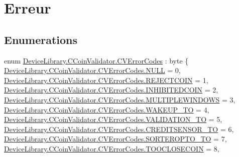 \hypertarget{group___erreur}{}\section{Erreur}
\label{group___erreur}
\subsection*{Enumerations}
\begin{DoxyCompactItemize}
\item 
enum \mbox{\hyperlink{group___erreur_ga68c5b73cc3b337502d9f92154d933591}{Device\+Library.\+C\+Coin\+Validator.\+C\+V\+Error\+Codes}} \+: byte \{ \newline
\mbox{\hyperlink{group___erreur_gga68c5b73cc3b337502d9f92154d933591a6c3e226b4d4795d518ab341b0824ec29}{Device\+Library.\+C\+Coin\+Validator.\+C\+V\+Error\+Codes.\+N\+U\+LL}} = 0, 
\mbox{\hyperlink{group___erreur_gga68c5b73cc3b337502d9f92154d933591a4a3172fa5d33d5089aa41cf83c8099f8}{Device\+Library.\+C\+Coin\+Validator.\+C\+V\+Error\+Codes.\+R\+E\+J\+E\+C\+T\+C\+O\+IN}} = 1, 
\mbox{\hyperlink{group___erreur_gga68c5b73cc3b337502d9f92154d933591a236caf0a304503bf0fca29ee75e1d863}{Device\+Library.\+C\+Coin\+Validator.\+C\+V\+Error\+Codes.\+I\+N\+H\+I\+B\+I\+T\+E\+D\+C\+O\+IN}} = 2, 
\mbox{\hyperlink{group___erreur_gga68c5b73cc3b337502d9f92154d933591ae56f4cf37b6999372dc21bb47e82d73c}{Device\+Library.\+C\+Coin\+Validator.\+C\+V\+Error\+Codes.\+M\+U\+L\+T\+I\+P\+L\+E\+W\+I\+N\+D\+O\+WS}} = 3, 
\newline
\mbox{\hyperlink{group___erreur_gga68c5b73cc3b337502d9f92154d933591a875eb06a96859ac39b2ff14d3a5360de}{Device\+Library.\+C\+Coin\+Validator.\+C\+V\+Error\+Codes.\+W\+A\+K\+E\+U\+P\+\_\+\+TO}} = 4, 
\mbox{\hyperlink{group___erreur_gga68c5b73cc3b337502d9f92154d933591a1de1001e85495d060e5fe77182345937}{Device\+Library.\+C\+Coin\+Validator.\+C\+V\+Error\+Codes.\+V\+A\+L\+I\+D\+A\+T\+I\+O\+N\+\_\+\+TO}} = 5, 
\mbox{\hyperlink{group___erreur_gga68c5b73cc3b337502d9f92154d933591ae8e1da986224d6127b836dee5515b989}{Device\+Library.\+C\+Coin\+Validator.\+C\+V\+Error\+Codes.\+C\+R\+E\+D\+I\+T\+S\+E\+N\+S\+O\+R\+\_\+\+TO}} = 6, 
\mbox{\hyperlink{group___erreur_gga68c5b73cc3b337502d9f92154d933591aad786ab20e40eca4baf577f142271223}{Device\+Library.\+C\+Coin\+Validator.\+C\+V\+Error\+Codes.\+S\+O\+R\+T\+E\+R\+O\+P\+T\+O\+\_\+\+TO}} = 7, 
\newline
\mbox{\hyperlink{group___erreur_gga68c5b73cc3b337502d9f92154d933591a67eeaa2b6e727735860ab0fa45da5cf6}{Device\+Library.\+C\+Coin\+Validator.\+C\+V\+Error\+Codes.\+T\+O\+O\+C\+L\+O\+S\+E\+C\+O\+IN}} = 8, 

\end{DoxyCompactItemize}
